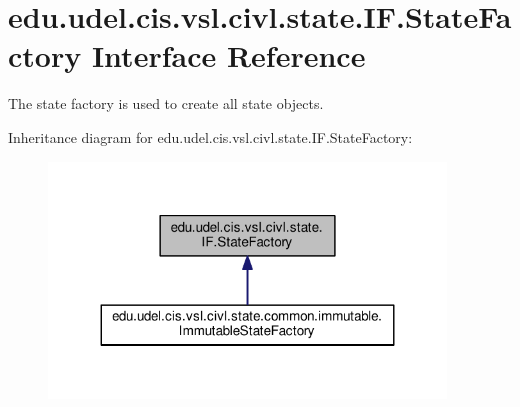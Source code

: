 \hypertarget{interfaceedu_1_1udel_1_1cis_1_1vsl_1_1civl_1_1state_1_1IF_1_1StateFactory}{}\section{edu.\+udel.\+cis.\+vsl.\+civl.\+state.\+I\+F.\+State\+Factory Interface Reference}
\label{interfaceedu_1_1udel_1_1cis_1_1vsl_1_1civl_1_1state_1_1IF_1_1StateFactory}


The state factory is used to create all state objects.  




Inheritance diagram for edu.\+udel.\+cis.\+vsl.\+civl.\+state.\+I\+F.\+State\+Factory\+:
\nopagebreak
\begin{figure}[H]
\begin{center}
\leavevmode
\includegraphics[width=299pt]{interfaceedu_1_1udel_1_1cis_1_1vsl_1_1civl_1_1state_1_1IF_1_1StateFactory__inherit__graph}
\end{center}
\end{figure}
